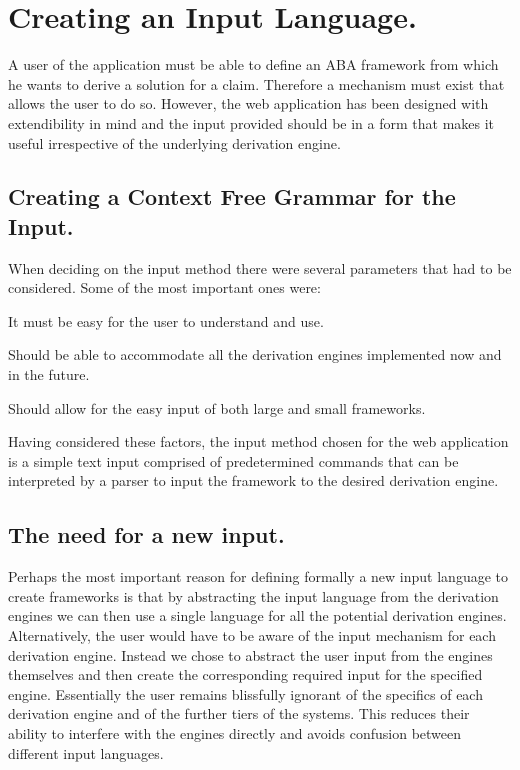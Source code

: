 \newpage

\chapter{Creating an Input Language.}

A user of the application must be able to define an ABA framework from which he wants to derive a solution for a claim. Therefore a mechanism must exist that allows the user to do so. However, the web application has been designed with extendibility in mind and the input provided should be in a form that makes it useful irrespective of the underlying derivation engine.

\section{Creating a Context Free Grammar for the Input.}

When deciding on the input method there were several parameters that had to be considered. Some of the most important ones were:

\begin{itemize*}
\item It must be easy for the user to understand and use.
\item Should be able to accommodate all the derivation engines implemented now and in the future.
\item Should allow for the easy input of both large and small frameworks.
\end{itemize*}

Having considered these factors, the input method chosen for the web application is a simple text input comprised of predetermined commands that can be interpreted by a parser to input the framework to the desired derivation engine.

\section{The need for a new input.}

Perhaps the most important reason for defining formally a new input language to create frameworks is that by abstracting the input language from the derivation engines we can then use a single language for all the potential derivation engines. Alternatively, the user would have to be aware of the input mechanism for each derivation engine. Instead we chose to abstract the user input from the engines themselves and then create the corresponding required input for the specified engine. Essentially the user remains blissfully ignorant of the specifics of each derivation engine and of the further tiers of the systems. This reduces their ability to interfere with the engines directly and avoids confusion between different input languages.

